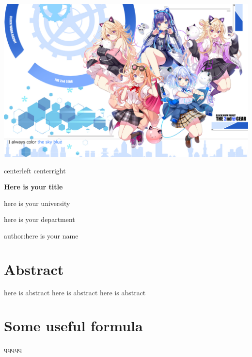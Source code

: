 \documentclass[12pt,a4paper]{report}
\newcommand{\customline}[4][center]{
    \noindent %
    \ifx#1left
        \makebox[0pt][l]{\textcolor{#4}{\rule{#2}{#3}}} %
    \else\ifx#1right
        \makebox[\textwidth][r]{\textcolor{#4}{\rule{#2}{#3}}} %
    \else
        \makebox[\textwidth]{\textcolor{#4}{\rule{#2}{#3}}} %
    \fi\fi
}
\begin{document}

\begin{titlepage}
  \centering
  \centerline{\includegraphics[width=\textwidth]{material/gochiusa_april2024.jpg}}%
  \customline[center]{\textwidth}{25pt}{definecolororeage} %
  \vspace*{1cm} %
   \begin{flushleft}
    \hspace*{2cm} 
    \begin{minipage}{\textwidth} 
        \Huge\textbf{\textrm{Here is your title}} 
        \vspace{1cm} 
        \par 
        \huge{here is your university} 
        \par 
        \huge{here is your department} 
    \end{minipage}
  \end{flushleft}
  \vfill
  \begin{flushleft}
    \hspace{2cm}
    \large{author:here is your name}
  \end{flushleft}
\end{titlepage}
\restoregeometry







\chapter*{Abstract}
here is abstract here is abstract here is abstract

\chapter*{Some useful formula}
qqqqq
\tableofcontents



\end{document}
